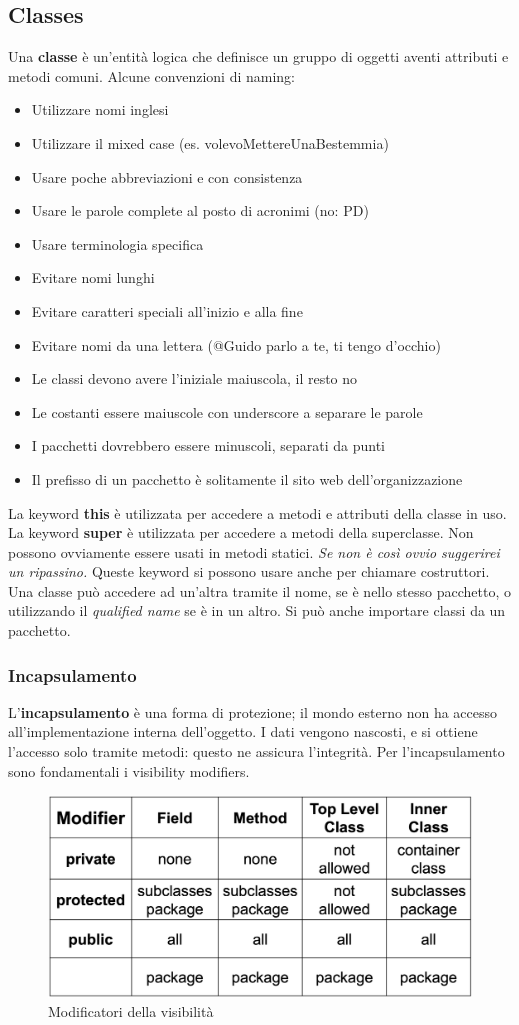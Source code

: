 \documentclass[11pt]{article}
\begin{document}
\subsection{Classes}
Una \textbf{classe} è un'entità logica che definisce un gruppo di oggetti aventi attributi e metodi comuni. Alcune convenzioni di naming:
\begin{itemize}
    \item Utilizzare nomi inglesi
    \item Utilizzare il mixed case (es. volevoMettereUnaBestemmia)
    \item Usare poche abbreviazioni e con consistenza
    \item Usare le parole complete al posto di acronimi (no: PD)
    \item Usare terminologia specifica
    \item Evitare nomi lunghi
    \item Evitare caratteri speciali all'inizio e alla fine
    \item Evitare nomi da una lettera (@Guido parlo a te, ti tengo d'occhio)
    \item Le classi devono avere l'iniziale maiuscola, il resto no
    \item Le costanti essere maiuscole con underscore a separare le parole
    \item I pacchetti dovrebbero essere minuscoli, separati da punti 
    \item Il prefisso di un pacchetto è solitamente il sito web dell'organizzazione
\end{itemize}
La keyword \textbf{this} è utilizzata per accedere a metodi e attributi della classe in uso. La keyword \textbf{super} è utilizzata per accedere a metodi della superclasse. Non possono ovviamente essere usati in metodi statici. \textit{Se non è così ovvio suggerirei un ripassino.} Queste keyword si possono usare anche per chiamare costruttori. Una classe può accedere ad un'altra tramite il nome, se è nello stesso pacchetto, o utilizzando il \textit{qualified name} se è in un altro. Si può anche importare classi da un pacchetto.
\subsubsection{Incapsulamento}
L'\textbf{incapsulamento} è una forma di protezione; il mondo esterno non ha accesso all'implementazione interna dell'oggetto. I dati vengono nascosti, e si ottiene l'accesso solo tramite metodi: questo ne assicura l'integrità. Per l'incapsulamento sono fondamentali i visibility modifiers. 
\begin{figure}[H]
    \centering
    \includegraphics[width=0.6\linewidth]{res/java/VisibilityModifiers.png}
    \caption{Modificatori della visibilità}
\end{figure}
\end{document}
